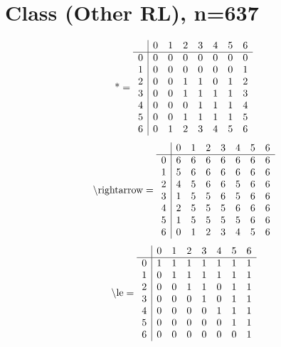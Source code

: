 \documentclass[11pt]{article}
\begin{document}
\section{Class (Other RL), n=637}
\[\text{*} = 
\begin{array}{r | r r r r r r r}
 & 0 & 1 & 2 & 3 & 4 & 5 & 6 \\ \hline
0 & 0 & 0 & 0 & 0 & 0 & 0 & 0 \\
1 & 0 & 0 & 0 & 0 & 0 & 0 & 1 \\
2 & 0 & 0 & 1 & 1 & 0 & 1 & 2 \\
3 & 0 & 0 & 1 & 1 & 1 & 1 & 3 \\
4 & 0 & 0 & 0 & 1 & 1 & 1 & 4 \\
5 & 0 & 0 & 1 & 1 & 1 & 1 & 5 \\
6 & 0 & 1 & 2 & 3 & 4 & 5 & 6 \\
\end{array}
\]
\[\text{\textbackslash rightarrow} = 
\begin{array}{r | r r r r r r r}
 & 0 & 1 & 2 & 3 & 4 & 5 & 6 \\ \hline
0 & 6 & 6 & 6 & 6 & 6 & 6 & 6 \\
1 & 5 & 6 & 6 & 6 & 6 & 6 & 6 \\
2 & 4 & 5 & 6 & 6 & 5 & 6 & 6 \\
3 & 1 & 5 & 5 & 6 & 5 & 6 & 6 \\
4 & 2 & 5 & 5 & 5 & 6 & 6 & 6 \\
5 & 1 & 5 & 5 & 5 & 5 & 6 & 6 \\
6 & 0 & 1 & 2 & 3 & 4 & 5 & 6 \\
\end{array}
\]
\[\text{\textbackslash le} = 
\begin{array}{r | r r r r r r r}
 & 0 & 1 & 2 & 3 & 4 & 5 & 6 \\ \hline
0 & 1 & 1 & 1 & 1 & 1 & 1 & 1 \\
1 & 0 & 1 & 1 & 1 & 1 & 1 & 1 \\
2 & 0 & 0 & 1 & 1 & 0 & 1 & 1 \\
3 & 0 & 0 & 0 & 1 & 0 & 1 & 1 \\
4 & 0 & 0 & 0 & 0 & 1 & 1 & 1 \\
5 & 0 & 0 & 0 & 0 & 0 & 1 & 1 \\
6 & 0 & 0 & 0 & 0 & 0 & 0 & 1 \\
\end{array}
\]
\end{document}
